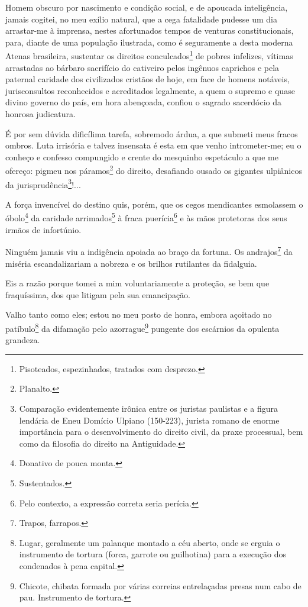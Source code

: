 \asterisc{}

Homem obscuro por nascimento e condição social, e de apoucada
inteligência, jamais cogitei, no meu exílio natural, que a cega
fatalidade pudesse um dia arrastar-me à imprensa, nestes afortunados
tempos de venturas constitucionais, para, diante de uma população
ilustrada, como é seguramente a desta moderna Atenas brasileira,
sustentar os direitos conculcados\footnote{Pisoteados, espezinhados,
  tratados com desprezo.} de pobres infelizes, vítimas arrastadas ao
bárbaro sacrifício do cativeiro pelos ingênuos caprichos e pela paternal
caridade dos civilizados cristãos de hoje, em face de homens notáveis,
jurisconsultos reconhecidos e acreditados legalmente, a quem o supremo e
quase divino governo do país, em hora abençoada, confiou o sagrado
sacerdócio da honrosa judicatura.

É por sem dúvida dificílima tarefa, sobremodo árdua, a que submeti meus
fracos ombros. Luta irrisória e talvez insensata é esta em que venho
intrometer-me; eu o conheço e confesso compungido e crente do mesquinho
espetáculo a que me ofereço: pigmeu nos páramos\footnote{Planalto.} do
direito, desafiando ousado os gigantes ulpiânicos da
jurisprudência\footnote{Comparação evidentemente irônica entre os
  juristas paulistas e a figura lendária de Eneu Domício Ulpiano
  (150-223), jurista romano de enorme importância para o desenvolvimento
  do direito civil, da praxe processual, bem como da filosofia do
  direito na Antiguidade.}!...

A força invencível do destino quis, porém, que os cegos mendicantes
esmolassem o óbolo\footnote{Donativo de pouca monta.} da caridade
arrimados\footnote{Sustentados.} à fraca puerícia\footnote{Pelo
  contexto, a expressão correta seria perícia.} e às mãos protetoras dos
seus irmãos de infortúnio.

Ninguém jamais viu a indigência apoiada ao braço da fortuna. Os
andrajos\footnote{Trapos, farrapos.} da miséria escandalizariam a
nobreza e os brilhos rutilantes da fidalguia.

Eis a razão porque tomei a mim voluntariamente a proteção, se bem que
fraquíssima, dos que litigam pela sua emancipação.

Valho tanto como eles; estou no meu posto de honra, embora açoitado no
patíbulo\footnote{Lugar, geralmente um palanque montado a céu aberto,
  onde se erguia o instrumento de tortura (forca, garrote ou guilhotina)
  para a execução dos condenados à pena capital.} da difamação pelo
azorrague\footnote{Chicote, chibata formada por várias correias
  entrelaçadas presas num cabo de pau. Instrumento de tortura.} pungente
dos escárnios da opulenta grandeza.

